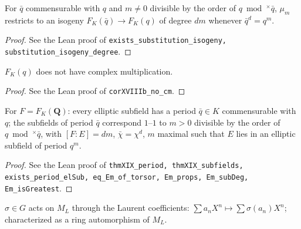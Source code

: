 \begin{corollary}
\label{cor:XVIIIa-subst}
\leanok
For $\bar q$ commensurable with $q$ and $m\ne0$ divisible by the order of $q\bmod^\times\bar q$, $\mu_m$ restricts to an isogeny $F_K(\bar q)\to F_K(q)$ of degree $dm$ whenever $\bar q^d=q^m$.
\end{corollary}
\begin{proof}
\leanok
See the Lean proof of \texttt{exists\_substitution\_isogeny, substitution\_isogeny\_degree}.
\end{proof}

\begin{corollary}
\label{cor:XVIIIb}
\leanok
$F_K(q)$ does not have complex multiplication.
\end{corollary}
\begin{proof}
\leanok
See the Lean proof of \texttt{corXVIIIb\_no\_cm}.
\end{proof}

\begin{theorem}
\label{thm:XIX}
\leanok
For $F=F_K(\mathbf Q)$: every elliptic subfield has a period $\bar q\in K$ commensurable with $q$; the subfields of period $\bar q$ correspond $1$--$1$ to $m>0$ divisible by the order of $q\bmod^\times\bar q$, with $[F:E]=dm$, $\bar\chi=\chi^d$, $m$ maximal such that $E$ lies in an elliptic subfield of period $q^m$.
\end{theorem}
\begin{proof}
\leanok
See the Lean proof of \texttt{thmXIX\_period, thmXIX\_subfields, exists\_period\_elSub, eq\_Em\_of\_torsor, Em\_props, Em\_subDeg, Em\_isGreatest}.
\end{proof}

\begin{definition}
\label{def:galois-action}
\leanok
$\sigma\in G$ acts on $M_L$ through the Laurent coefficients: $\sum a_nX^n\mapsto\sum\sigma(a_n)X^n$; characterized as a ring automorphism of $M_L$.
\end{definition}

